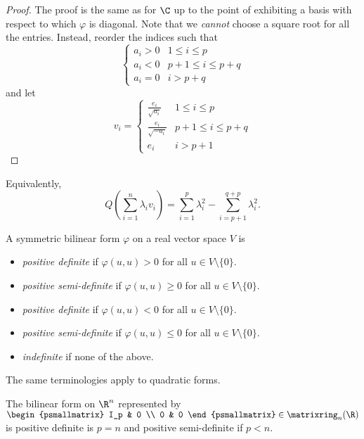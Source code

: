 \documentclass[a4paper]{article}
\newcommand*{\M}{\matrixring}
\theoremstyle{definition}
\begin{document}
\begin{proof}
  The proof is the same as for \(\C\) up to the point of exhibiting a basis with respect to which \(\varphi\) is diagonal. Note that we \emph{cannot} choose a square root for all the entries. Instead, reorder the indices such that
  \[
    \begin{cases}
      a_i > 0 & 1 \leq i \leq p \\
      a_i < 0 & p + 1 \leq i \leq p + q \\
      a_i = 0 & i > p + q
    \end{cases}
  \]
  and let
  \[
    v_i =
    \begin{cases}
      \frac{e_i}{\sqrt{a_i}} & 1 \leq i \leq p \\
      \frac{e_i}{\sqrt{-a_i}} & p + 1 \leq i \leq p + q \\
      e_i & i > p + 1
    \end{cases}
  \]
\end{proof}

Equivalently,
\[
  Q \left( \sum_{i = 1}^{n} \lambda_i v_i \right) = \sum_{i = 1}^{p} \lambda_i^2 - \sum_{i = p + 1}^{q + p} \lambda_i^2.
\]

\begin{definition}
  A symmetric bilinear form \(\varphi\) on a real vector space \(V\) is
  \begin{itemize}
  \item \emph{positive definite} if \(\varphi(u, u) > 0\) for all \(u \in V\setminus \{0\}\).
  \item \emph{positive semi-definite} if \(\varphi(u, u) \geq 0\) for all \(u \in V\setminus \{0\}\).
  \item \emph{positive definite} if \(\varphi(u, u) < 0\) for all \(u \in V\setminus \{0\}\).
  \item \emph{positive semi-definite} if \(\varphi(u, u) \leq 0\) for all \(u \in V\setminus \{0\}\).
  \item \emph{indefinite} if none of the above.
  \end{itemize}
\end{definition}

The same terminologies apply to quadratic forms.

\begin{eg}
  The bilinear form on \(\R^n\) represented by \(\begin{psmallmatrix} I_p & 0 \\ 0 & 0 \end{psmallmatrix} \in \M_n(\R)\) is positive definite is \(p = n\) and positive semi-definite if \(p < n\).
\end{eg}
\end{document}

